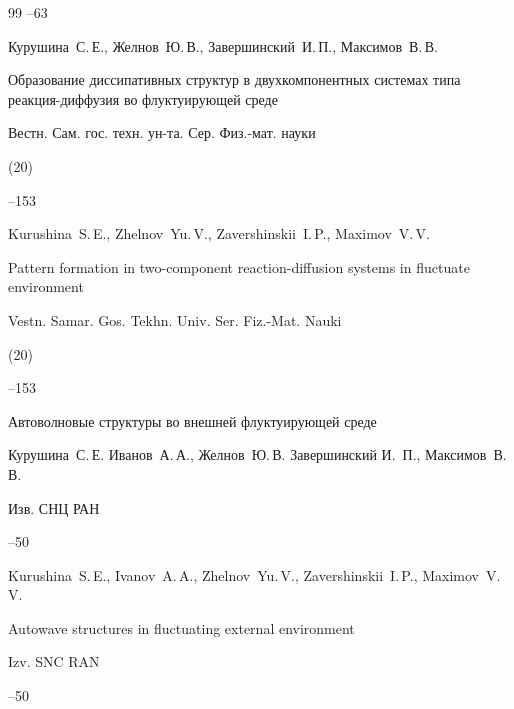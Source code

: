 \begin{thebibliography}{99}
--63




\by Курушина~С.\,Е., Желнов~Ю.\,В., Завершинский~И.\,П., Максимов~В.\,В.

\paper Образование диссипативных структур в двухкомпонентных системах типа реакция-диффузия во флуктуирующей среде

\jour Вестн. Сам. гос. техн. ун-та. Сер. Физ.-мат. науки


(20)

--153


\misctransl 

\by Kurushina~S.\,E., Zhelnov~Yu.\,V., Zavershinskii~I.\,P., Maximov~V.\,V.

\paper Pattern formation in two-component reaction-diffusion systems in fluctuate environment

\jour Vestn. Samar. Gos. Tekhn. Univ. Ser. Fiz.-Mat. Nauki


(20)

--153






\paper Автоволновые структуры во внешней флуктуирующей среде

\by Курушина~С.\,Е.  Иванов~А.\,А., Желнов~Ю.\,В. Завершинский И.~П., Максимов~В.\,В. 

\jour Изв. СНЦ РАН




--50


\misctransl

\by Kurushina~S.\,E., Ivanov~A.\,A., Zhelnov~Yu.\,V., Zavershinskii~I.\,P., Maximov~V.\,V.

\paper Autowave structures in fluctuating external environment

\jour Izv. SNC RAN




--50




\end{thebibliography}
